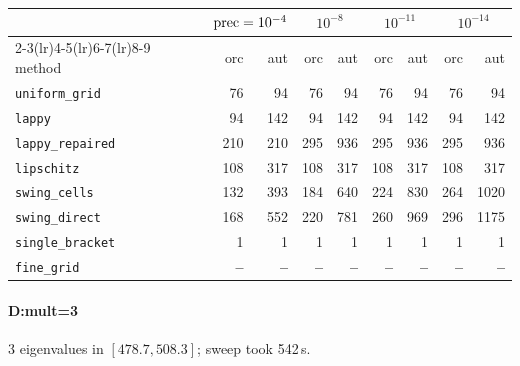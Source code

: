 \begin{center}
\small
\begin{tabular}{lrrrrrrrr}
\toprule
& \multicolumn{2}{c}{$\mathrm{prec}=10^{-4}$} & \multicolumn{2}{c}{$10^{-8}$} & \multicolumn{2}{c}{$10^{-11}$} & \multicolumn{2}{c}{$10^{-14}$} \\
\cmidrule(lr){2-3}\cmidrule(lr){4-5}\cmidrule(lr){6-7}\cmidrule(lr){8-9}
method & orc & aut & orc & aut & orc & aut & orc & aut \\
\midrule
\texttt{uniform\_grid} & 76 & 94 & 76 & 94 & 76 & 94 & 76 & 94 \\
\texttt{lappy} & 94 & 142 & 94 & 142 & 94 & 142 & 94 & 142 \\
\texttt{lappy\_repaired} & 210 & 210 & 295 & 936 & 295 & 936 & 295 & 936 \\
\texttt{lipschitz} & 108 & 317 & 108 & 317 & 108 & 317 & 108 & 317 \\
\texttt{swing\_cells} & 132 & 393 & 184 & 640 & 224 & 830 & 264 & 1020 \\
\texttt{swing\_direct} & 168 & 552 & 220 & 781 & 260 & 969 & 296 & 1175 \\
\midrule
\texttt{single\_bracket} & 1 & 1 & 1 & 1 & 1 & 1 & 1 & 1 \\
\texttt{fine\_grid} & \textbf{--} & \textbf{--} & \textbf{--} & \textbf{--} & \textbf{--} & \textbf{--} & \textbf{--} & \textbf{--} \\
\bottomrule
\end{tabular}
\end{center}

\paragraph{D:mult=3} 3 eigenvalues in $[478.7, 508.3]$; sweep took 542\,s.

